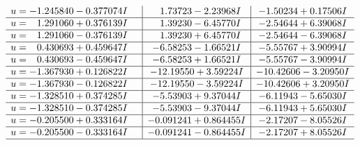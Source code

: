 \documentclass[1p]{elsarticle_modified}
\theoremstyle{definition}
\begin{document}
$$\begin{array}{c|c|c}
\begin{aligned}
u &= -1.245840 - 0.377074 I\end{aligned}
 & \phantom{-}1.73723 - 2.23968 I & -1.50234 + 0.17506 I \\ \hline\begin{aligned}
u &= \phantom{-}1.291060 + 0.376139 I\end{aligned}
 & \phantom{-}1.39230 - 6.45770 I & -2.54644 + 6.39068 I \\ \hline\begin{aligned}
u &= \phantom{-}1.291060 - 0.376139 I\end{aligned}
 & \phantom{-}1.39230 + 6.45770 I & -2.54644 - 6.39068 I \\ \hline\begin{aligned}
u &= \phantom{-}0.430693 + 0.459647 I\end{aligned}
 & -6.58253 - 1.66521 I & -5.55767 + 3.90994 I \\ \hline\begin{aligned}
u &= \phantom{-}0.430693 - 0.459647 I\end{aligned}
 & -6.58253 + 1.66521 I & -5.55767 - 3.90994 I \\ \hline\begin{aligned}
u &= -1.367930 + 0.126822 I\end{aligned}
 & -12.19550 + 3.59224 I & -10.42606 - 3.20950 I \\ \hline\begin{aligned}
u &= -1.367930 - 0.126822 I\end{aligned}
 & -12.19550 - 3.59224 I & -10.42606 + 3.20950 I \\ \hline\begin{aligned}
u &= -1.328510 + 0.374285 I\end{aligned}
 & -5.53903 + 9.37044 I & -6.11943 - 5.65030 I \\ \hline\begin{aligned}
u &= -1.328510 - 0.374285 I\end{aligned}
 & -5.53903 - 9.37044 I & -6.11943 + 5.65030 I \\ \hline\begin{aligned}
u &= -0.205500 + 0.333164 I\end{aligned}
 & -0.091241 + 0.864455 I & -2.17207 - 8.05526 I \\ \hline\begin{aligned}
u &= -0.205500 - 0.333164 I\end{aligned}
 & -0.091241 - 0.864455 I & -2.17207 + 8.05526 I\\
 \hline 
 \end{array}$$\newpage
\end{document}
